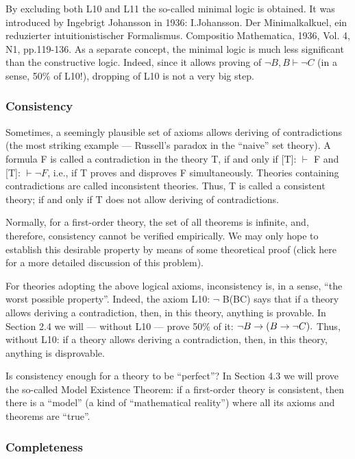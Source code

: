 By excluding both L10 and L11 the so-called minimal logic is obtained. It was introduced by Ingebrigt Johansson in 1936: I.Johansson. Der Minimalkalkuel, ein reduzierter intuitionistischer Formalismus. Compositio Mathematica, 1936, Vol. 4, N1, pp.119-136.  As a separate concept, the minimal logic is much less significant than the constructive logic. Indeed, since it allows proving of \(\neg B, B \vdash \neg C\) (in a sense, 50\% of L10!), dropping of L10 is not a very big step.

\subsubsection{Consistency}

Sometimes, a seemingly plausible set of axioms allows deriving of contradictions (the most striking example --- Russell's paradox in the ``naive'' set theory). A formula F is called a contradiction in the theory T, if and only if [T]: \(\vdash\) F and [T]: \(\vdash \neg F\), i.e., if T proves and disproves F simultaneously. Theories containing contradictions are called inconsistent theories. Thus, T is called a consistent theory; if and only if T does not allow deriving of contradictions.

Normally, for a first-order theory, the set of all theorems is infinite, and, therefore, consistency cannot be verified empirically. We may only hope to establish this desirable property by means of some theoretical proof (click here for a more detailed discussion of this problem).

For theories adopting the above logical axioms, inconsistency is, in a sense, ``the worst possible property''.  Indeed, the axiom L10: \(\neg\) B\IMPLIES (B\IMPLIES C) says that if a theory allows deriving a contradiction, then, in this theory, anything is provable. In Section 2.4 we will --- without L10 --- prove 50\% of it: \(\neg B\rightarrow (B\rightarrow \neg C).\) Thus, without L10: if a theory allows deriving a contradiction, then, in this theory, anything is disprovable.

Is consistency enough for a theory to be ``perfect''?
In Section 4.3 we will prove the so-called Model Existence Theorem: if a first-order theory is consistent, then there is a ``model'' (a kind of ``mathematical reality'') where all its axioms and theorems are ``true''.

\subsubsection{Completeness}

